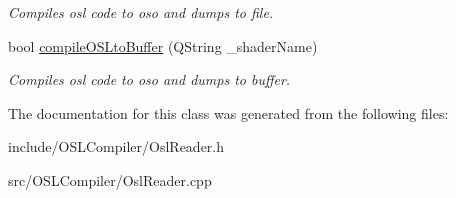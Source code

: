 \begin{DoxyCompactItemize}
\begin{DoxyCompactList}\small\item\em Compiles osl code to oso and dumps to file. \end{DoxyCompactList}\item 
\hypertarget{class_osl_reader_a9409c31526e8530cee322f06b74f29b4}{bool \hyperlink{class_osl_reader_a9409c31526e8530cee322f06b74f29b4}{compile\-O\-S\-Lto\-Buffer} (Q\-String \-\_\-shader\-Name)}\label{class_osl_reader_a9409c31526e8530cee322f06b74f29b4}

\begin{DoxyCompactList}\small\item\em Compiles osl code to oso and dumps to buffer. \end{DoxyCompactList}\end{DoxyCompactItemize}


The documentation for this class was generated from the following files\-:\begin{DoxyCompactItemize}
\item 
include/\-O\-S\-L\-Compiler/Osl\-Reader.\-h\item 
src/\-O\-S\-L\-Compiler/Osl\-Reader.\-cpp\end{DoxyCompactItemize}
